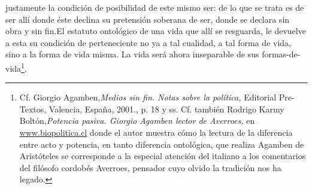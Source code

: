 justamente la condición de posibilidad de este mismo ser: de lo que se trata es de ser allí donde éste declina su pretensión soberana de ser, donde se declara sin obra y sin fin.El estatuto ontológico de una vida que allí se resguarda, le devuelve a esta su condición de perteneciente no ya a tal cualidad, a tal forma de vida, sino a la forma de vida misma. La vida será ahora inseparable de sus formas-de-vida\footnote{Cf. Giorgio Agamben,\emph{Medios sin fin. Notas sobre la política,} Editorial Pre-Textos, Valencia, España, 2001., p. 18 y ss. Cf. también Rodrigo Karmy Boltón,\emph{Potencia pasiva. Giorgio Agamben lector de Averroes,} en \href{http://www.biopolitica.cl/}{www.biopolitica.cl} donde el autor muestra cómo la lectura de la diferencia entre acto y potencia, en tanto diferencia ontológica, que realiza Agamben de Aristóteles se corresponde a la especial atención del italiano a los comentarios del filósofo cordobés Averroes, pensador cuyo olvido la tradición nos ha legado.}.
%
%
